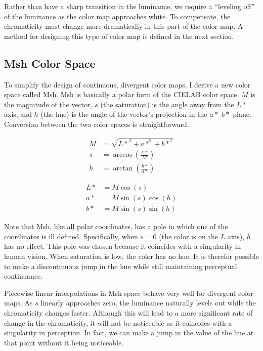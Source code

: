 \documentclass[twocolumn]{article}
\newcommand{\Lab}{CIELAB\xspace}
\newcommand{\Msh}{Msh\xspace}
\begin{document}
Rather than have a sharp transition in the luminance, we require a
``leveling off'' of the luminance as the color map approaches white.  To
compensate, the chromaticity must change more dramatically in this part of
the color map.  A method for designing this type of color map is defined in
the next section.

\subsection{\Msh Color Space}
\label{sec:MshColorSpace}

To simplify the design of continuous, divergent color maps, I derive a new
color space called \Msh.  \Msh is basically a polar form of the \Lab color
space.  $M$ is the magnitude of the vector, $s$ (the saturation) is the
angle away from the $L*$ axis, and $h$ (the hue) is the angle of the
vector's projection in the $a*$-$b*$ plane.  Conversion between the two
color spaces is straightforward.

\begin{equation}
  \begin{split}
    M &= \sqrt{{L*}^2 + a*^2 + b*^2} \\
    s &= \arccos\left(\frac{L*}{M}\right) \\
    h &= \arctan\left(\frac{b*}{a*}\right)
  \end{split}
  \label{eqn:LabToMsh}
\end{equation}

\begin{equation}
  \begin{split}
    L* &= M \cos\left(s\right) \\
    a* &= M \sin\left(s\right) \cos\left(h\right) \\
    b* &= M \sin\left(s\right) \sin\left(h\right)
  \end{split}
\end{equation}

Note that \Msh, like all polar coordinates, has a pole in which one of the
coordinates is ill defined.  Specifically, when $s = 0$ (the color is on
the $L$ axis), $h$ has no effect.  This pole was chosen because it
coincides with a singularity in human vision.  When saturation is low, the
color has no hue.  It is therefor possible to make a discontinuous jump
in the hue while still maintaining perceptual continuance.

Piecewise linear interpolations in \Msh space behave very well for
divergent color maps.  As $s$ linearly approaches zero, the luminance
naturally levels out while the chromaticity changes faster.  Although this
will lead to a more significant rate of change in the chromaticity, it will
not be noticeable as it coincides with a singularity in perception.  In
fact, we can make a jump in the value of the hue at that point without it
being noticeable.
\end{document}
